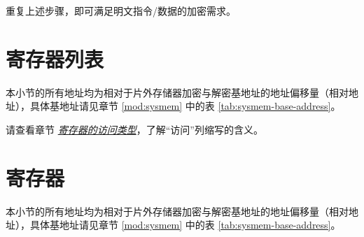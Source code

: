 \documentclass[main\_\_CN.tex]{subfiles}
\begin{document}
重复上述步骤，即可满足明文指令/数据的加密需求。





\clearpage
\hypertarget{extmemencr-reg-summ}{}
\section{寄存器列表}
\label{sec:extmemencr-reg-summ}

本小节的所有地址均为相对于片外存储器加密与解密基地址的地址偏移量（相对地址），具体基地址请见章节 \ref{mod:sysmem} \textit{} 中的表 \ref{tab:sysmem-base-address}。

请查看章节 \hyperref[glossary-access-types]{\textit{寄存器的访问类型}}，了解“访问”列缩写的含义。






\clearpage
\section{寄存器}

本小节的所有地址均为相对于片外存储器加密与解密基地址的地址偏移量（相对地址），具体基地址请见章节 \ref{mod:sysmem} \textit{} 中的表 \ref{tab:sysmem-base-address}。


\end{document}
